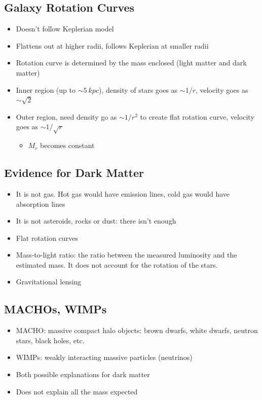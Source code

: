 \documentclass{book}
\begin{document}
\subsection{Galaxy Rotation Curves}
\begin{itemize}
    \item Doesn’t follow Keplerian model
    \item Flattens out at higher radii, follows Keplerian at smaller radii
    \item Rotation curve is determined by the mass enclosed (light matter and dark matter)
    \item Inner region (up to $\sim 5\ kpc$), density of stars goes as $\sim 1/r$, velocity goes as $\sim \sqrt{2}$
    \item Outer region, need density go as $\sim 1/r^2$ to create flat rotation curve, velocity goes as $\sim 1 / \sqrt{r}$
          \begin{itemize}
              \item  $M_r$ becomes constant
          \end{itemize}
\end{itemize}
\subsection{Evidence for Dark Matter}
\begin{itemize}
    \item It is not gas. Hot gas would have emission lines, cold gas would have absorption lines
    \item It is not asteroids, rocks or dust: there isn’t enough
    \item Flat rotation curves
    \item Mass-to-light ratio: the ratio between the measured luminosity and the estimated mass. It does not account for the rotation of the stars.
    \item Gravitational lensing
\end{itemize}
\subsection{MACHOs, WIMPs}
\begin{itemize}
    \item MACHO: massive compact halo objects: brown dwarfs, white dwarfs, neutron stars, black holes, etc.
    \item WIMPs: weakly interacting massive particles (neutrinos)
    \item Both possible explanations for dark matter
    \item Does not explain all the mass expected
\end{itemize}
\end{document}
